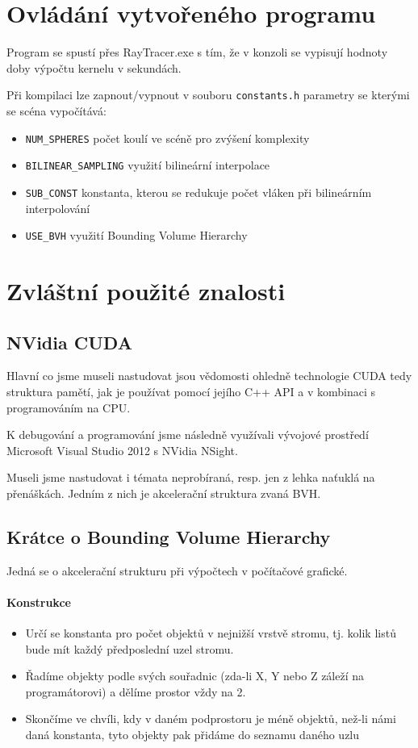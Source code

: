 \documentclass[12pt,a4paper,titlepage,final]{report}
\begin{document}
\section{Ovládání vytvořeného programu}

Program se spustí přes RayTracer.exe s tím, že v konzoli se vypisují hodnoty doby výpočtu kernelu v sekundách.

Při kompilaci lze zapnout/vypnout v souboru \verb|constants.h| parametry se kterými se scéna vypočítává:
\begin{itemize}
	\item \verb|NUM_SPHERES| počet koulí ve scéně pro zvýšení komplexity
	\item \verb|BILINEAR_SAMPLING| využití bilineární interpolace
	\item \verb|SUB_CONST| konstanta, kterou se redukuje počet vláken při bilineárním interpolování
	\item \verb|USE_BVH| využití Bounding Volume Hierarchy
\end{itemize}

\section{Zvláštní použité znalosti}

\subsection{NVidia CUDA}
Hlavní co jsme museli nastudovat jsou vědomosti ohledně technologie CUDA tedy struktura pamětí, jak je používat pomocí jejího C++ API a v kombinaci s programováním na CPU.

K debugování a programování jsme následně využívali vývojové prostředí Microsoft Visual Studio 2012 s NVidia NSight.

Museli jsme nastudovat i témata neprobíraná, resp. jen z lehka naťuklá na přenáškách. Jedním z nich je akcelerační struktura zvaná BVH.

\subsection{Krátce o Bounding Volume Hierarchy}
Jedná se o akcelerační strukturu při výpočtech v počítačové grafické.

\paragraph{Konstrukce}
\begin{itemize}
	\item Určí se konstanta pro počet objektů v nejnižší vrstvě stromu, tj. kolik listů bude mít každý předposlední uzel stromu.
	\item Řadíme objekty podle svých souřadnic (zda-li X, Y nebo Z záleží na programátorovi) a dělíme prostor vždy na 2.
	\item Skončíme ve chvíli, kdy v daném podprostoru je méně objektů, než-li námi daná konstanta, tyto objekty pak přidáme do seznamu daného uzlu
\end{itemize}
\end{document}
